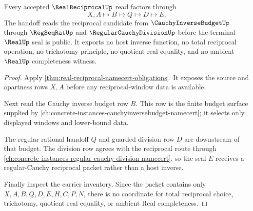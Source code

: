 \begin{theorem}
\label{thm:real-reciprocal-regular-cauchy-handoff}
Every accepted $\RealReciprocalUp$ read factors through
$$
X,A \longmapsto B \longmapsto Q \longmapsto D \longmapsto E .
$$
The handoff reads the reciprocal candidate from $\CauchyInverseBudgetUp$ through $\RegSeqRatUp$ and $\RegularCauchyDivisionUp$ before the terminal $\RealUp$ seal is public. It exports no host inverse function, no total reciprocal operation, no trichotomy principle, no quotient real equality, and no ambient $\RealUp$ completeness witness.
\end{theorem}
\begin{proof}
Apply \autoref{thm:real-reciprocal-namecert-obligations}. It exposes the source and apartness rows $X,A$ before any reciprocal-window data is available.

Next read the Cauchy inverse budget row $B$. This row is the finite budget surface supplied by \autoref{ch:concrete-instances-cauchyinversebudget-namecert}; it selects only displayed windows and lower-bound data.

The regular rational handoff $Q$ and guarded division row $D$ are downstream of that budget. The division row agrees with the reciprocal route through \autoref{ch:concrete-instances-regular-cauchy-division-namecert}, so the seal $E$ receives a regular-Cauchy reciprocal packet rather than a host inverse.

Finally inspect the carrier inventory. Since the packet contains only $X,A,B,Q,D,E,H,C,P,N$, there is no coordinate for total reciprocal choice, trichotomy, quotient real equality, or ambient Real completeness.
\end{proof}




